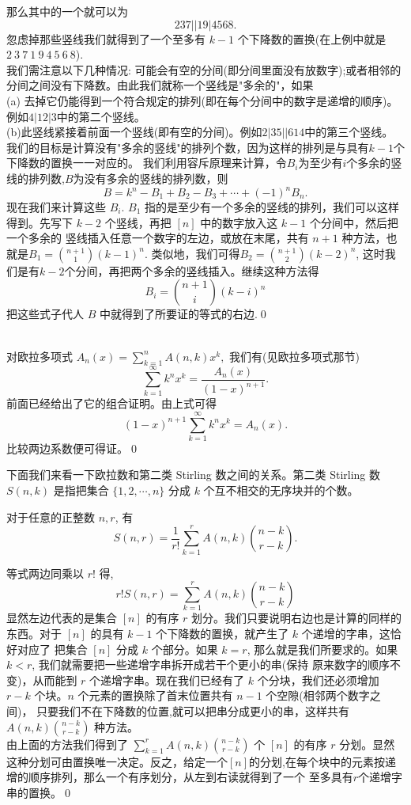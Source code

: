 那么其中的一个就可以为 $$237||19|4568.$$
忽虑掉那些竖线我们就得到了一个至多有 $k-1$
个下降数的置换(在上例中就是 $2~3~7~1~9~4~5~6~8$).
\\我们需注意以下几种情况:
可能会有空的分间(即分间里面没有放数字);或者相邻的分间之间没有下降数。由此我们就称一个竖线是"多余的"，如果
\\(a)
去掉它仍能得到一个符合规定的排列(即在每个分间中的数字是递增的顺序)。例如$4|12|3$中的第二个竖线。
\\(b)此竖线紧接着前面一个竖线(即有空的分间)。例如$2|35||614$中的第三个竖线。
我们的目标是计算没有"多余的竖线"的排列个数，因为这样的排列是与具有$k-1$个下降数的置换一一对应的。
我们利用容斥原理来计算，令$B_i$为至少有$i$个多余的竖线的排列数,$B$为没有多余的竖线的排列数，则
$$
B=k^n-B_1+B_2-B_3+\cdots +(-1)^nB_n.
$$
现在我们来计算这些 $B_i$. $B_1$
指的是至少有一个多余的竖线的排列，我们可以这样得到。先写下 $k-2$
个竖线，再把 $[n]$ 中的数字放入这 $k-1$ 个分间中，然后把一个多余的
竖线插入任意一个数字的左边，或放在末尾，共有 $n+1$
种方法，也就是$B_1={n+1 \choose 1}(k-1)^n$.
类似地，我们可得$B_2={n+1 \choose 2}(k-2)^n$,
这时我们是有$k-2$个分间，再把两个多余的竖线插入。继续这种方法得$$B_i={n+1
\choose i}(k-i)^n$$把这些式子代人 $B$
中就得到了所要证的等式的右边.\qed


\\
 对欧拉多项式 $A_n(x)=\sum\limits^n_{k=1}A(n,k)x^k,$
我们有(见欧拉多项式那节)
$$\sum\limits^{\infty}_{k=1}k^nx^k=\frac{A_n(x)}{(1-x)^{n+1}}.$$
前面已经给出了它的组合证明。由上式可得$$(1-x)^{n+1}\sum\limits^{\infty}_{k=1}k^nx^k=A_n(x).$$
比较两边系数便可得证。\qed

下面我们来看一下欧拉数和第二类 Stirling 数之间的关系。第二类
Stirling 数 $S(n,k)$ 是指把集合 $\{1,2,\cdots,n\}$ 分成 $k$
个互不相交的无序块并的个数。

\begin{thm}
对于任意的正整数 $n,r$, 有
\begin{equation}
S(n,r)=\frac{1}{r!}\sum_{k=1}^{r}A(n,k){n-k\choose r-k}.
\end{equation}
\end{thm}

 等式两边同乘以
$r!$ 得, $$r!S(n,r)=\sum_{k=1}^{r}A(n,k){n-k\choose r-k}$$
显然左边代表的是集合 $[n]$ 的有序 $r$
划分。我们只要说明右边也是计算的同样的东西。对于 $[n]$ 的具有 $k-1$
个下降数的置换，就产生了 $k$ 个递增的字串，这恰好对应了 把集合 $[n]$
分成 $k$ 个部分。如果 $k=r$, 那么就是我们所要求的。如果 $k<r$,
我们就需要把一些递增字串拆开成若干个更小的串(保持
原来数字的顺序不变)，从而能到 $r$ 个递增字串。现在我们已经有了 $k$
个分块，我们还必须增加 $r-k$ 个块。$n$ 个元素的置换除了首末位置共有
$n-1$ 个空隙(相邻两个数字之间)，
只要我们不在下降数的位置,就可以把串分成更小的串，这样共有$A(n,k){n-k\choose
r-k}$ 种方法。
\\由上面的方法我们得到了 $\sum_{k=1}^{r}A(n,k){n-k\choose
r-k}$ 个 $[n]$ 的有序 $r$
分划。显然这种分划可由置换唯一决定。反之，给定一个$[n]$的分划,在每个块中的元素按递增的顺序排列，那么一个有序划分，从左到右读就得到了一个
至多具有$r$个递增字串的置换。\qed

